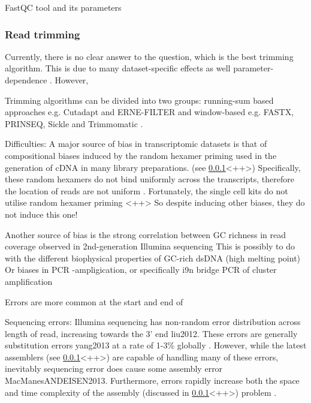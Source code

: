 FastQC tool and its parameters

\subsubsection{Read trimming}



Currently, there is no clear answer to the question, which is the best trimming algorithm.
This is due to many dataset-specific effects as well parameter-dependence \citep{DelFabbro2013}.
However, 



Trimming algorithms can be divided into two groups: running-sum based approaches e.g. Cutadapt and ERNE-FILTER
and window-based e.g. FASTX, PRINSEQ, Sickle and Trimmomatic \citep{DelFabbro2013}.












Difficulties: 
A major source of bias in transcriptomic datasets is that of compositional biases induced
by the random hexamer priming used in the generation of cDNA in many library preparations.
(see \ref{}<++>) %
Specifically, these random hexamers do not bind uniformly across the transcripts,
therefore the location of reads are not uniform \citep{Hansen2010}\citep{Hansen2010}.
Fortunately, the single cell kits do not utilise random hexamer priming {}<++> %
So despite inducing other biases, they do not induce this one!


Another source of bias is the strong correlation between GC richness in read coverage
observed in 2nd-generation Illumina sequencing \citep{Dohm2008,}
This is possibly to do with the different biophysical properties of GC-rich dsDNA (high melting point) \citep{Dohm2008} %
Or biases in PCR -ampligication, or specifically i9n bridge PCR of cluster amplification


Errors are more common at the start and end of 




Sequencing errors: Illumina sequencing has non-random error distribution across length of read, increasing towards the 3' end liu2012. These errors are generally substitution errors yang2013 at a rate of 1-3\% globally \citep{MacManes2014}.  However, while the latest assemblers (see \ref{}<++>) are capable of %
handling many of these errors, inevitably sequencing error does cause some
assembly error MacManesANDEISEN2013.
Furthermore, errors rapidly increase both the space and time complexity of the assembly (discussed in \ref{}<++>) problem \citep{MacManes2014}.

